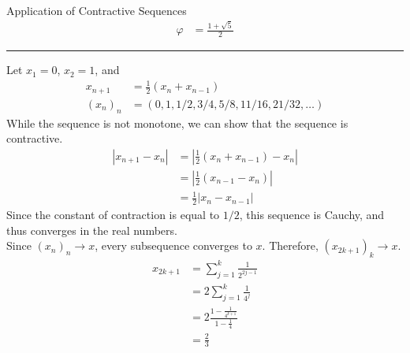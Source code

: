 \documentclass[10pt]{extarticle}
\begin{document}
\begin{problem}{Application of Contractive Sequences}
\begin{align*}
      \varphi &= \frac{1 + \sqrt{5}}{2}
    \end{align*}
    \vspace{4pt}
    \rule{\textwidth}{0.4pt}
    \vspace{4pt}
    Let $x_1 = 0$, $x_2 = 1$, and
    \begin{align*}
      x_{n+1} &= \frac{1}{2}(x_n + x_{n-1})\\
      (x_n)_n &= \left(0,1,1/2,3/4,5/8,11/16,21/32,\dots\right)
    \end{align*}
    While the sequence is not monotone, we can show that the sequence is contractive.
    \begin{align*}
      |x_{n+1}-x_n| &= \left|\frac{1}{2}\left(x_{n}+x_{n-1}\right) - x_n\right|\\
                    &= \left|\frac{1}{2}\left(x_{n-1}-x_n\right)\right|\\
                    &= \frac{1}{2}|x_n-x_{n-1}|
    \end{align*}
    Since the constant of contraction is equal to $1/2$, this sequence is Cauchy, and thus converges in the real numbers.\\

    Since $(x_n)_n\rightarrow x$, every subsequence converges to $x$. Therefore, $(x_{2k+1})_k\rightarrow x$.
    \begin{align*}
      x_{2k+1} &= \sum_{j=1}^{k} \frac{1}{2^{2j-1}}\\
               &= 2 \sum_{j=1}^{k}\frac{1}{4^j}\\
               &= 2 \frac{1-\frac{1}{4^{k+1}}}{1-\frac{1}{4}}\\
               &= \frac{2}{3} \tag*{$k\rightarrow\infty$}
    \end{align*}
  \end{problem}
\end{document}
